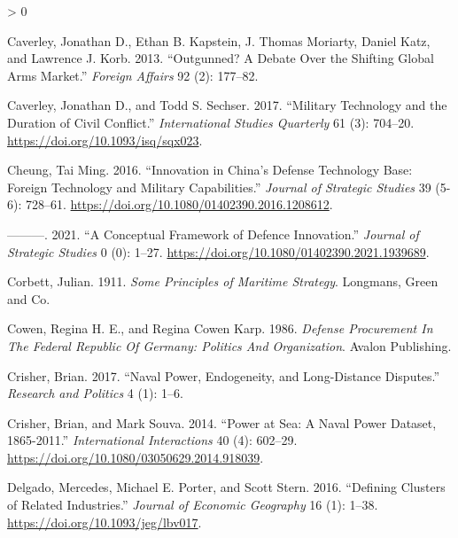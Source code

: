 \documentclass[
]{article}
\newlength{\cslhangindent}
\newenvironment{CSLReferences}[2] %
 {%
  \setlength{\parindent}{0pt}
  \ifodd #1 \everypar{\setlength{\hangindent}{\cslhangindent}}\ignorespaces\fi
  \ifnum #2 > 0
  \setlength{\parskip}{#2\baselineskip}
  \fi
 }%
 {}
\begin{document}
\begin{CSLReferences}{1}{0}
\leavevmode\hypertarget{ref-caverley_outgunneddebateshifting_2013}{}%
Caverley, Jonathan D., Ethan B. Kapstein, J. Thomas Moriarty, Daniel Katz, and Lawrence J. Korb. 2013. {``Outgunned? {A Debate Over} the {Shifting Global Arms Market}.''} \emph{Foreign Affairs} 92 (2): 177--82.

\leavevmode\hypertarget{ref-caverley_militarytechnologyduration_2017}{}%
Caverley, Jonathan D., and Todd S. Sechser. 2017. {``Military {Technology} and the {Duration} of {Civil Conflict}.''} \emph{International Studies Quarterly} 61 (3): 704--20. \url{https://doi.org/10.1093/isq/sqx023}.

\leavevmode\hypertarget{ref-cheung_innovationchinadefense_2016}{}%
Cheung, Tai Ming. 2016. {``Innovation in {China}'s {Defense Technology Base}: {Foreign Technology} and {Military Capabilities}.''} \emph{Journal of Strategic Studies} 39 (5-6): 728--61. \url{https://doi.org/10.1080/01402390.2016.1208612}.

\leavevmode\hypertarget{ref-cheung_conceptualframeworkdefence_2021}{}%
---------. 2021. {``A Conceptual Framework of Defence Innovation.''} \emph{Journal of Strategic Studies} 0 (0): 1--27. \url{https://doi.org/10.1080/01402390.2021.1939689}.

\leavevmode\hypertarget{ref-corbett_principlesmaritimestrategy_1911}{}%
Corbett, Julian. 1911. \emph{Some {Principles} of {Maritime Strategy}}. {Longmans, Green and Co.}

\leavevmode\hypertarget{ref-cowen_defenseprocurementfederal_1986}{}%
Cowen, Regina H. E., and Regina Cowen Karp. 1986. \emph{Defense {Procurement In The Federal Republic Of Germany}: {Politics And Organization}}. {Avalon Publishing}.

\leavevmode\hypertarget{ref-crisher_navalpowerendogeneity_2017}{}%
Crisher, Brian. 2017. {``Naval Power, Endogeneity, and Long-Distance Disputes.''} \emph{Research and Politics} 4 (1): 1--6.

\leavevmode\hypertarget{ref-crisher_powerseanaval_2014}{}%
Crisher, Brian, and Mark Souva. 2014. {``Power at {Sea}: {A Naval Power Dataset}, 1865-2011.''} \emph{International Interactions} 40 (4): 602--29. \url{https://doi.org/10.1080/03050629.2014.918039}.

\leavevmode\hypertarget{ref-delgado_definingclustersrelated_2016}{}%
Delgado, Mercedes, Michael E. Porter, and Scott Stern. 2016. {``Defining Clusters of Related Industries.''} \emph{Journal of Economic Geography} 16 (1): 1--38. \url{https://doi.org/10.1093/jeg/lbv017}.


\end{CSLReferences}
\end{document}
